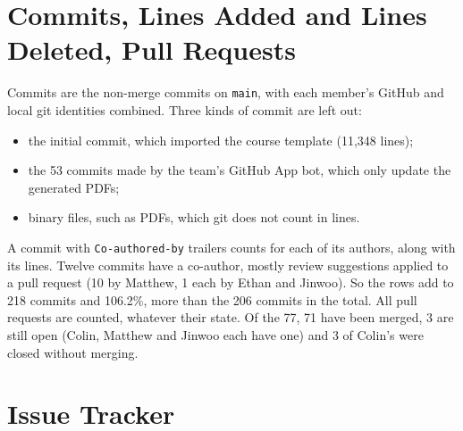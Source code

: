 \documentclass{article}
\begin{document}
\section{Commits, Lines Added and Lines Deleted, Pull Requests}

\begin{table}[H]
\centering
{}
\end{table}

Commits are the non-merge commits on \texttt{main}, with each member's GitHub
and local git identities combined. Three kinds of commit are left out:
\begin{itemize}
  \item the initial commit, which imported the course template (11{,}348
    lines);
  \item the 53 commits made by the team's GitHub App bot, which only update the
    generated PDFs;
  \item binary files, such as PDFs, which git does not count in lines.
\end{itemize}
A commit with \texttt{Co-authored-by} trailers counts for each of its authors,
along with its lines. Twelve commits have a co-author, mostly review suggestions
applied to a pull request (10 by Matthew, 1 each by Ethan and Jinwoo). So the
rows add to 218 commits and 106.2\%, more than the 206 commits in the total. All pull requests are counted,
whatever their state. Of the 77, 71 have been merged, 3 are still open
(Colin, Matthew and Jinwoo each have one) and 3 of Colin's were closed without
merging.

\section{Issue Tracker}
\end{document}
